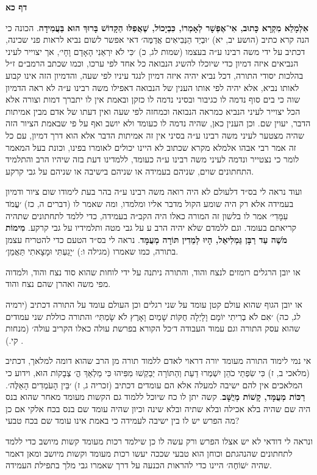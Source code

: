 \documentclass[12pt, openany]{book}
\newcommand{\sethebfont}{
\fontsize{10.5pt}{13.1pt} \selectfont
}
\newcommand{\twocol}[1]{
	{\sethebfont \begin{multicols}{2}
			#1
	\end{multicols}}	
}
\newcommand{\sectname}{}
\newcommand{\newsection}[1]{
	\renewcommand{\sectname}{#1}	
	\vspace{-\baselineskip}
	\begin{center}
		\textbf{%
\fontsize{16pt}{16pt}\selectfont
			#1}
	\end{center}
	\vspace{-\baselineskip}
	\nopagebreak
}
\begin{document}
\newsection{דף כא}
\twocol{\textbf{אִלְמָלֵא מִקְרָא כָּתוּב, אִי־אֶפְשָׁר לְאָמְרוֹ, כִּבְיָכוֹל, שֶׁאֲפִלּוּ הַקָּדוֹשׁ בָּרוּךְ הוּא בַּעֲמִידָה}. הכונה כי הנה קרא כתיב {\small (הושע יב, יא)} ׳וּבְיַד הַנְּבִיאִים אֲדַמֶּה׳ דאי אפשר לשום נביא לראות פני שכינה, דכתיב על ידי משה רבינו ע״ה בעצמו {\small (שמות לג, כ)} ׳כִּי לֹא יִרְאַנִי הָאָדָם וָחָי׳, אך יצוייר לעיני הנביאים איזה דמיון כדי שיוכלו להשיג הנבואה כל אחד לפי ערכו, וכמו שכתב הרמב״ם ז״ל בהלכות יסודי התורה, דכל נביא יהיה איזה דמיון לנגד עיניו לפי שעה, והדמיון הזה אינו קבוע לאותו נביא, אלא יהיה לפי אותו הענין של הנבואה דאפילו משה רבינו ע״ה לא ראה הדמיון שוה כי בים סוף נדמה לו כגיבור ובסיני נדמה לו כזקן ובאמת אין לו יתברך דמות וצורה אלא הכל יצוייר לעיני הנביא כמראה הנבואה וכמחזה לפי שעה ואין דעתו של אדם מבין אמיתות הדבר, יעוין שם. וכן הענין כאן, שהיה נדמה לו כעומד ולא יושב ואף על פי שבאמת הציור הזה שהיה מצטער לעיני משה רבינו ע״ה בסיני אין זה אמיתות הדבר אלא הוא דרך דמיון, עם כל זה אמר רבי אבהו אלמלא מקרא שכתוב לא היינו יכולים לאומרו בפינו, וכונת בעל המאמר לומר כי נצטייר ונדמה לעיני משה רבינו ע״ה כעומד, ללמדינו דעת בזה שיהיו הרב והתלמיד התחתונים שוים, שניהם בעמידה או שניהם בישיבה או שניהם על גבי קרקע.\par ועוד נראה לי בס״ד דלעולם לא היה רואה משה רבינו ע״ה בהר בעת לימודו שום ציור ודמיון בעמידה אלא רק היה שומע הקול מדבר אליו ומלמדו, ומה שאמר לו {\small (דברים ה, כז)} ׳עֲמֹד עִמָּדִי׳ אמר לו בלשון זה המורה כאלו היה הקב״ה בעמידה, כדי ללמד לתחתונים שתהיה קריאתם בעומד. וגם ללמדם שלא יהיה הרב ע על גבי מטה ותלמידיו על גבי קרקע.
\textbf{מִימוֹת מֹשֶׁה עַד רַבָּן גַּמְלִיאֵל, הָיוּ לְמֵדִין תּוֹרָה מְעֻמָּד}. נראה לי בס״ד הטעם כדי להטריח עצמן בתורה, כמו שאמרו {\small (מגילה ו:)} ׳יָגַעְתִּי וּמָצָאתִי תַּאֲמֵן׳.\par או יובן הרגלים רומזים לנצח והוד, והתורה ניתנה על ידי לוחות שהוא סוד נצח והוד, ולמדוה מפי משה ואהרן שהם נצח והוד.\par או יובן הגוף שהוא עולם קטן עומד על שני רגלים וכן העולם עומד על התורה דכתיב {\small (ירמיה לג, כה)} ׳אִם לֹא בְרִיתִי יוֹמָם וָלָיְלָה חֻקּוֹת שָׁמַיִם וָאָרֶץ לֹא שָׂמְתִּי׳ והתורה כוללת שני עמודים שהוא עסק התורה וגם עמוד העבודה ד׳כל הקורא בפרשת עולה כאלו הקריב עולה׳ {\small (מנחות קי.)} .\par אי נמי לימוד התורה מעומד יורה דראוי לאדם ללמוד תורה מן הרב שהוא דומה למלאך, דכתיב {\small (מלאכי ב, ז)} כִּי שִׂפְתֵי כֹהֵן יִשְׁמְרוּ דַעַת וְהַתּוֹרָה יְבַקְשׁוּ מִפִּיהוּ כִּי מַלְאַךְ הֳ׳ צְבָקוֹת הוּא, וידוע כי המלאכים אין להם ישיבה למעלה אלא הם עומדים דכתיב {\small (זכריה ג, ז)} ׳בֵּין הָעֹמְדִים הָאֵלֶּה׳.
\textbf{רַכּוֹת מְעֻמָּד, קָשׁוֹת מְיֻשָּׁב}. קשה יתן לו כח שיוכל ללמוד גם הקשות מעומד מאחר שהוא בנס היה שם שהיה בלא אכילה ובלא שתיה ובלא שינה וכיון שהיה עומד שם בנס בכח אלקי אם כן מה הפרש יש לו בין ישיבה לעמידה כי באמת אינו עומד שם בכח טבעי?\par ונראה לי דודאי לא יש אצלו הפרש ורק עשה לו כן שילמד רכות מעומד קשות מיושב כדי ללמד לתחתונים שהנהגתם וכוחן הוא טבעי שככה יעשו רכות מעומד וקשות מיושב ומאן דאמר שהיה ׳שׁוֹחֶה׳ היינו כדי להראות הכנעה על דרך שאמרו גבי מלך בתפילת העמידה.}


\end{document}
